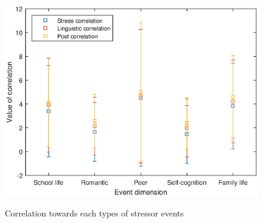 \begin{figure}
\centering
\caption{Correlation towards each types of stressor events}
\includegraphics[width=\linewidth]{figs/correlation2.eps}%
\label{fig:correlation}
\end{figure}

